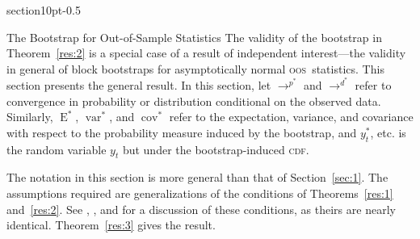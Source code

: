 \documentclass[11pt,fleqn]{article}
\makeatletter
\renewcommand\section{\@startsection%
{section}{1}{0pt}{-\baselineskip}{0.5\baselineskip}%
{\normalfont\normalsize\bfseries\large\raggedright}}
\theoremstyle{definition}
\DeclareMathOperator{\E}{E}
\DeclareMathOperator{\var}{var}
\DeclareMathOperator{\cov}{cov}
\newcommand{\cdf}{\textsc{cdf}}
\newcommand{\oos}{\textsc{oos}}
\makeatother
\begin{document}
\section{The Bootstrap for Out-of-Sample Statistics}\label{sec:1b}
The validity of the bootstrap in Theorem~\ref{res:2} is a special case
of a result of independent interest---the validity in general of block
bootstraps for asymptotically normal \oos\ statistics.  This section
presents the general result.  In this section, let $\to^{p^{*}}$ and
$\to^{d^{*}}$ refer to convergence in probability or distribution
conditional on the observed data.  Similarly, $\E^{*}$, $\var^{*}$,
and $\cov^{*}$ refer to the expectation, variance, and covariance with
respect to the probability measure induced by the bootstrap, and
$y_t^{*}$, etc. is the random variable $y_t$ but under the
bootstrap-induced \cdf.

The notation in this section is more general than that of
Section~\ref{sec:1}.  The assumptions required are generalizations of
the conditions of Theorems~\ref{res:1} and~\ref{res:2}.  See
\citet{Wes:96,Wes:06}, \citet{WeM:98}, and \citet{Mcc:00} for a
discussion of these conditions, as theirs are nearly identical.
Theorem~\ref{res:3} gives the result.
\end{document}
